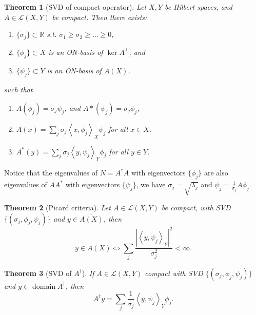\documentclass[12pt]{article}
\newtheorem{theorem}{Theorem}[section]
\theoremstyle{definition}
\newcommand{\real}{\mathbb{R}}   %
\newcommand{\abs}[1]{\left|#1\right|}
\DeclareMathOperator{\domain}{domain}
\newcommand\inner[2]{\left\langle#1, #2\right\rangle}
\begin{document}
\begin{theorem}[SVD of compact operator]
    Let $X,Y$ be Hilbert spaces, and $A\in \mathcal{L}(X,Y)$ be compact. Then there exists:
    \begin{enumerate}[label=(\alph*)]
        \item $\{\sigma_j\} \subset \real$ s.t. $\sigma_1\geq \sigma_2\geq\dots\geq 0$,
        \item $\{\phi_j\}\subset X$ is an ON-basis of $\ker A^\perp$, and
        \item $\{\psi_j\}\subset Y$ is an ON-basis of $\overline{A(X)}$.
    \end{enumerate}
    such that 
    \begin{enumerate}[label=(\roman*)]
        \item $A(\phi_j) = \sigma_j \psi_j$, and $A*(\psi_j) = \sigma_j \phi_j$,
        \item $A(x) = \sum_j \sigma_j \inner{x}{\phi_j}_X \psi_j$ for all $x\in X$.
        \item $A^*(y) = \sum_j \sigma_j \inner{y}{\psi_j}_Y \phi_j$ for all $y\in Y$.
    \end{enumerate}
\end{theorem}


Notice that the eigenvalues of $N=A^*A$ with eigenvectors $\{\phi_j\}$ are also eigenvalues of $AA^*$ with eigenvectors $\{ \psi_j\}$, we have $\sigma_j = \sqrt{\lambda_j}$ and $\psi_j = \frac{1}{\sigma_j}A\phi_j$.

\begin{theorem}[Picard criteria]
    Let $A\in \mathcal{L}(X,Y)$ be compact, with SVD $\{(\sigma_j,\phi_j, \psi_j)\}$ and $y\in \overline{A(X)}$, then
    \begin{equation*}
        y\in A(X) \Longleftrightarrow \sum_j \frac{\abs{\inner{y}{\psi_j}_Y}^2}{\sigma_j^2}<\infty.
    \end{equation*}
\end{theorem}

\begin{theorem}[SVD of $A^\dagger $]
    If $A\in \mathcal{L}(X,Y)$ compact with SVD $\{(\sigma_j,\phi_j, \psi_j)\}$  and $y\in\domain A^\dagger $, then
    \begin{equation*}
        A^\dagger y = \sum_j \frac{1}{\sigma_j}\inner{y}{\psi_j}_Y\phi_j.
    \end{equation*}
\end{theorem}
\end{document}
